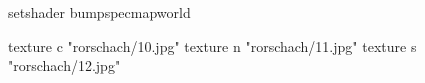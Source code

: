 setshader bumpspecmapworld

    texture c "rorschach/10.jpg"
    texture n "rorschach/11.jpg"
    texture s "rorschach/12.jpg"
